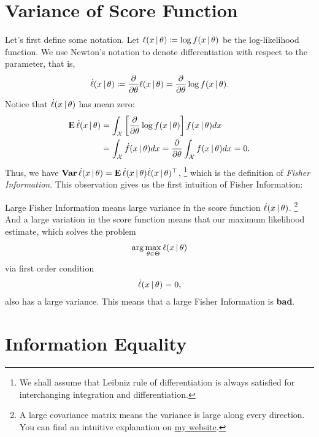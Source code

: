 \documentclass[a4paper]{article}
\begin{document}
\section{Variance of Score Function}

Let's first define some notation.
Let $\ell(x\,|\,\theta)\coloneqq\log f(x\,|\,\theta)$ be the log-likelihood function.
We use Newton's notation to denote differentiation with respect to the parameter,
that is,
\begin{align*}
	\dot\ell(x\,|\,\theta)
	\coloneqq \frac{\partial}{\partial\theta} \ell(x\,|\,\theta)
	= \frac{\partial}{\partial\theta} \log f(x\,|\,\theta).
\end{align*}
Notice that $\dot\ell(x\,|\,\theta)$ has mean zero:
\begin{align*}
	\operatorname{\text{\textrm{\upshape\textbf{E}}}}\dot\ell(x\,|\,\theta)
	&= \int_{\mathcal{X}} \left[ \frac{\partial}{\partial\theta} \log f(x\,|\,\theta) \right] f(x\,|\,\theta) dx \\
	&= \int_{\mathcal{X}} \dot f(x\,|\,\theta) dx 
	= \frac{\partial}{\partial\theta} \int_{\mathcal{X}} f(x\,|\,\theta) dx = 0.
\end{align*}
Thus, we have $\operatorname{\text{\textrm{\upshape\textbf{Var}}}}\dot\ell(x\,|\,\theta) = \operatorname{\text{\textrm{\upshape\textbf{E}}}}\dot\ell(x\,|\,\theta)\dot\ell(x\,|\,\theta)^{\top}$,
\footnote{
	We shall assume that Leibniz rule of differentiation is always satisfied for interchanging integration and differentiation.
}
which is the definition of \emph{Fisher Information}.
This observation gives us the first intuition of Fisher Information:

\begin{intuition}\label{intuition-1}
	Large Fisher Information means large variance in the score function $\dot\ell(x\,|\,\theta)$.
	\footnote{
		A large covariance matrix means the variance is large along every direction.
		You can find an intuitive explanation on \href{https://jessekelighine.com}{my website}.
	}
	And a large variation in the score function means that our maximum likelihood estimate,
	which solves the problem
	\begin{align*}
		\arg\max_{\theta\in\Theta}\ell(x\,|\,\theta)
	\end{align*}
	via first order condition
	\begin{align*} 
		\dot\ell(x\,|\,\theta)=0,
	\end{align*}
	also has a large variance.
	This means that a large Fisher Information is \textbf{bad}.
\end{intuition}

\section{Information Equality}
\end{document}
